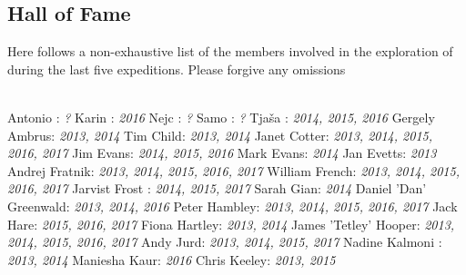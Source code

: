\begin{fullwidth} \chapter{Hall of Fame} 

Here follows a non-exhaustive list of the members involved in the exploration of  during the last five expeditions. Please forgive any omissions 

\begin{multicols}{2} \\ 
Antonio : \textsl{? }
\newline
Karin : \textsl{2016 }
\newline
Nejc : \textsl{? }
\newline
Samo : \textsl{? }
\newline
Tja\v{s}a : \textsl{2014, 2015, 2016 }
\newline
Gergely Ambrus: \textsl{2013, 2014 }
\newline
Tim Child: \textsl{2013, 2014 }
\newline
Janet Cotter: \textsl{2013, 2014, 2015, 2016, 2017 }
\newline
Jim Evans: \textsl{2014, 2015, 2016 }
\newline
Mark Evans: \textsl{2014 }
\newline
Jan Evetts: \textsl{2013 }
\newline
Andrej Fratnik: \textsl{2013, 2014, 2015, 2016, 2017 }
\newline
William French: \textsl{2013, 2014, 2015, 2016, 2017 }
\newline
Jarvist Frost : \textsl{2014, 2015, 2017 }
\newline
Sarah Gian: \textsl{2014 }
\newline
Daniel 'Dan' Greenwald: \textsl{2013, 2014, 2016 }
\newline
Peter Hambley: \textsl{2013, 2014, 2015, 2016, 2017 }
\newline
Jack Hare: \textsl{2015, 2016, 2017 }
\newline
Fiona Hartley: \textsl{2013, 2014 }
\newline
James 'Tetley' Hooper: \textsl{2013, 2014, 2015, 2016, 2017 }
\newline
Andy Jurd: \textsl{2013, 2014, 2015, 2017 }
\newline
Nadine Kalmoni : \textsl{2013, 2014 }
\newline
Maniesha Kaur: \textsl{2016 }
\newline
Chris Keeley: \textsl{2013, 2015 }

\end{multicols}
\end{fullwidth}
